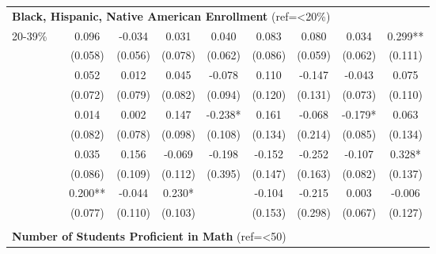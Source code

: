 \begin{tabular*}{\linewidth}{@{\extracolsep{\fill} } llcccccccc}
\multicolumn{10}{l}{\multirow{2}{1.8in}{\textbf{Black, Hispanic, Native American Enrollment} (ref=<20\%)}}\\%
&&&&&&&&&\\%
\multirow{2}{*}{\hspace{0.2cm}20{-}39\%}&&0.096&{-}0.034&0.031&0.040&0.083&0.080&0.034&0.299**\\%
&&(0.058)&(0.056)&(0.078)&(0.062)&(0.086)&(0.059)&(0.062)&(0.111)\\%
\arrayrulecolor{white}%
\hline%
\arrayrulecolor{white}%
\hline%
\arrayrulecolor{white}%
\hline%
\arrayrulecolor{white}%
\hline%
\arrayrulecolor{white}%
\hline%
\multirow{2}{*}{\hspace{0.2cm}40{-}59\%}&&0.052&0.012&0.045&{-}0.078&0.110&{-}0.147&{-}0.043&0.075\\%
&&(0.072)&(0.079)&(0.082)&(0.094)&(0.120)&(0.131)&(0.073)&(0.110)\\%
\arrayrulecolor{white}%
\hline%
\arrayrulecolor{white}%
\hline%
\arrayrulecolor{white}%
\hline%
\arrayrulecolor{white}%
\hline%
\arrayrulecolor{white}%
\hline%
\multirow{2}{*}{\hspace{0.2cm}60{-}79\%}&&0.014&0.002&0.147&{-}0.238*&0.161&{-}0.068&{-}0.179*&0.063\\%
&&(0.082)&(0.078)&(0.098)&(0.108)&(0.134)&(0.214)&(0.085)&(0.134)\\%
\arrayrulecolor{white}%
\hline%
\arrayrulecolor{white}%
\hline%
\arrayrulecolor{white}%
\hline%
\arrayrulecolor{white}%
\hline%
\arrayrulecolor{white}%
\hline%
\multirow{2}{*}{\hspace{0.2cm}80{-}89\%}&&0.035&0.156&{-}0.069&{-}0.198&{-}0.152&{-}0.252&{-}0.107&0.328*\\%
&&(0.086)&(0.109)&(0.112)&(0.395)&(0.147)&(0.163)&(0.082)&(0.137)\\%
\arrayrulecolor{white}%
\hline%
\arrayrulecolor{white}%
\hline%
\arrayrulecolor{white}%
\hline%
\arrayrulecolor{white}%
\hline%
\arrayrulecolor{white}%
\hline%
\multirow{2}{*}{\hspace{0.2cm}90\%+}&&0.200**&{-}0.044&0.230*&&{-}0.104&{-}0.215&0.003&{-}0.006\\%
&&(0.077)&(0.110)&(0.103)&&(0.153)&(0.298)&(0.067)&(0.127)\\%
\arrayrulecolor{white}%
\hline%
\arrayrulecolor{white}%
\hline%
\arrayrulecolor{white}%
\hline%
\arrayrulecolor{white}%
\hline%
\arrayrulecolor{white}%
\hline%
&&&&&&&&&\\%
\multicolumn{10}{l}{\multirow{2}{1.8in}{\textbf{Number of Students Proficient in Math} (ref=<50)}}\\%

\end{tabular*}
